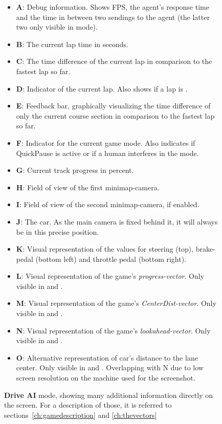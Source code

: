 \begin{figure}[h!t]
	\caption[Screenshot: drive AI mode with annotations]{\textbf{Drive AI} mode, showing many additional information directly on the screen. For a description of those, it is referred to sections~\ref{ch:gamedescription} and \ref{ch:thevectors}}
	\label{fig:aidriveshot}
	\begin{itemize}
		\small
		\setlength\itemsep{0.1em}
		\item \textbf{A}: Debug information. Shows FPS, the agent's response time and the time in between two sendings to the agent (the latter two only visible in  mode).
		\item \textbf{B}: The current lap time in seconds.
		\item \textbf{C}: The time difference of the current lap in comparison to the fastest lap so far.
		\item \textbf{D}: Indicator of the current lap. Also shows if a lap is .
		\item \textbf{E}: Feedback bar, graphically visualizing the time difference of only the current course section in comparison to the fastest lap so far.
		\item \textbf{F}: Indicator for the current game mode. Also indicates if QuickPause is active or if a human interferes in the  mode.
		\item \textbf{G}: Current track progress in percent.
		\item \textbf{H}: Field of view of the first minimap-camera.
		\item \textbf{I}: Field of view of the second minimap-camera, if enabled.
		\item \textbf{J}: The car. As the main camera is fixed behind it, it will always be in this precise position.
		\item \textbf{K}: Visual representation of the values for steering (top), brake-pedal (bottom left) and throttle pedal (bottom right).
		\item \textbf{L}: Visual representation of the game's \textit{progress-vector}. Only visible in  and .
		\item \textbf{M}: Visual representation of the game's \textit{CenterDist-vector}. Only visible in  and .
		\item \textbf{N}: Visual representation of the game's \textit{lookahead-vector}. Only visible in  and .
		\item \textbf{O}: Alternative representation of car's distance to the lane center. Only visible in  and . Overlapping with N due to low screen resolution on the machine used for the screenshot.

\end{itemize}
\end{figure}
